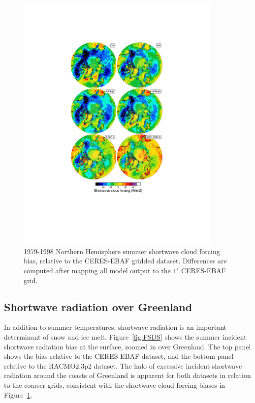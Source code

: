 \documentclass[draft]{agujournal2019}
\begin{document}
\begin{figure}[t]
\begin{center}
         \includegraphics[width=100mm]{figs/temp_contours_diffCERES_SWCF.pdf}
\end{center}
\caption{1979-1998 Northern Hemisphere summer shortwave cloud forcing bias, relative to the CERES-EBAF gridded dataset. Differences are computed after mapping all model output to the $1^{\circ}$ CERES-EBAF grid.}
\label{fig:SWCF}
\end{figure}

\subsection{Shortwave radiation over Greenland}

In addition to summer temperatures, shortwave radiation is an important determinant of snow and ice melt. Figure~\ref{fig:FSDS} shows the summer incident shortwave radiation bias at the surface, zoomed in over Greenland. The top panel shows the bias relative to the CERES-EBAF dataset, and the bottom panel relative to the RACMO2.3p2 dataset.
The halo of excessive incident shortwave radiation around the coasts of Greenland is apparent for both datasets in relation to the coarser grids, consistent with the shortwave cloud forcing biases in Figure~\ref{fig:SWCF}.
\end{document}
